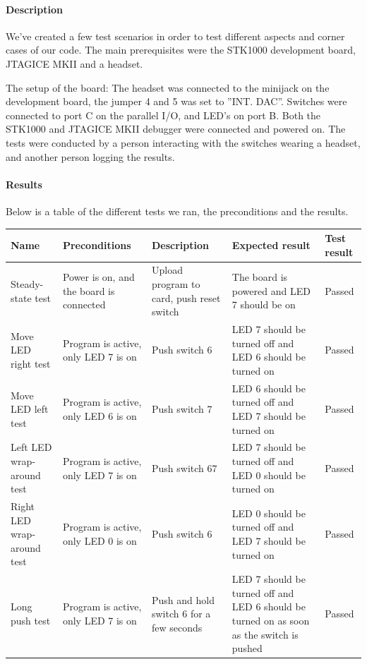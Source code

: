 \documentclass[a4paper,11pt]{article}
\begin{document}
\paragraph{Description}
We've created a few test scenarios in order to test different aspects and corner cases of our code. The main prerequisites were the STK1000 development board, JTAGICE MKII and a headset.

The setup of the board: 
The headset was connected to the minijack on the development board, the jumper 4 and 5 was set to ''INT. DAC''.
Switches were connected to port C on the parallel I/O, and LED's on port B. 
Both the STK1000 and JTAGICE MKII debugger were connected and powered on. The tests were conducted by a person interacting with the switches wearing a headset, and another person logging the results.

\paragraph{Results}
Below is a table of the different tests we ran, the preconditions and the results.
\linebreak

\renewcommand{\arraystretch}{1.25} %
\begin{tabular}[pos]{|m{70pt}|m{90pt}|m{90pt}|m{100pt}|m{60pt}|}
\hline
\textbf{Name} 				& \textbf{Preconditions}				& \textbf{Description} 					& \textbf{Expected result} 													& \textbf{Test result} 		\\ \hline

Steady-state test			& Power is on, and the board is connected & Upload program to card, push reset switch 	& The board is powered and LED 7 should be on 									& Passed 				\\ \hline

Move LED right test			& Program is active, only LED 7 is on 		& Push switch 6						 	& LED 7 should be turned off and LED 6 should be turned on 							& Passed 				\\ \hline

Move LED left test			& Program is active, only LED 6 is on 		& Push switch 7						 	& LED 6 should be turned off and LED 7 should be turned on 							& Passed 				\\ \hline

Left LED wrap-around test		& Program is active, only LED 7 is on 		& Push switch 67					 	& LED 7 should be turned off and LED 0 should be turned on 							& Passed 				\\ \hline

Right LED wrap-around test	& Program is active, only LED 0 is on 		& Push switch 6						 	& LED 0 should be turned off and LED 7 should be turned on 							& Passed 				\\ \hline

Long push test				& Program is active, only LED 7 is on 		& Push and hold switch 6 for a few seconds 	& LED 7 should be turned off and LED 6 should be turned on as soon as the switch is pushed 	& Passed 				\\ \hline
\end{tabular}
\end{document}
